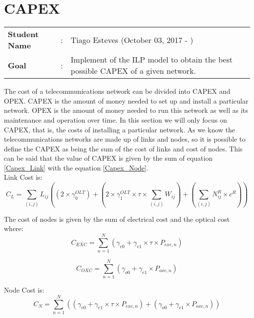 \clearpage

\section{CAPEX}
\begin{tcolorbox}	
\begin{tabular}{p{2.75cm} p{0.2cm} p{10.5cm}} 	
\textbf{Student Name}  &:& Tiago Esteves    (October 03, 2017 - )\\
\textbf{Goal}          &:& Implement of the ILP model to obtain the best possible CAPEX of a given network.
\end{tabular}
\end{tcolorbox}
\vspace{11pt}

The cost of a telecommunications network can be divided into CAPEX and OPEX.
CAPEX is the amount of money needed to set up and install a particular network.
OPEX is the amount of money needed to run this network as well as its maintenance and operation over time.
In this section we will only focus on CAPEX, that is, the costs of installing a particular network.
As we know the telecommunications networks are made up of links and nodes, so it is possible to define the CAPEX as being the sum of the cost of links and cost of nodes.
This can be said that the value of CAPEX is given by the sum of equation \ref{Capex_Link} with the equation \ref{Capex_Node}.\\

Link Cost is:\\
\begin{equation}
C_L = \sum_{(i,j)} L_{ij} \left( (2 \times \gamma_0^{OLT}) + (2 \times \gamma_1^{OLT} \times \tau \times \sum_{(i,j)} W_{ij}) + (\sum_{(i,j)} N^R_{ij} \times c^R) \right)
\label{Capex_Link}
\end{equation}


The cost of nodes is given by the sum of electrical cost and the optical cost where:\\
\begin{equation}
C_{EXC} = \sum_{n=1}^{N} \left(\gamma_{e0} + \gamma_{e1} \times \tau \times P_{exc,n} \right)
\label{Capex_Node_EXC}
\end{equation}

\begin{equation}
C_{OXC} = \sum_{n=1}^{N} \left(\gamma_{o0} + \gamma_{e1} \times P_{oxc,n} \right)
\label{Capex_Node_OXC}
\end{equation}

Node Cost is:\\
\begin{equation}
C_N = \sum_{n=1}^{N} \left( (\gamma_{e0} + \gamma_{e1} \times \tau \times P_{exc,n}) + (\gamma_{o0} + \gamma_{e1} \times P_{oxc,n}) \right)
\label{Capex_Node}
\end{equation}

